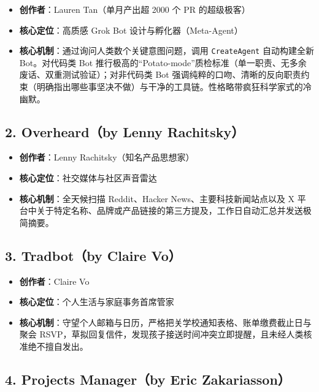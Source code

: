 \documentclass[10.5pt,a4paper,oneside]{report}
\providecommand{\tightlist}{\setlength{\itemsep}{0pt}\setlength{\parskip}{0pt}}
\newcommand{\passthrough}[1]{#1}
\begin{document}
\begin{itemize}
\tightlist
\item
  \textbf{创作者}：Lauren Tan（单月产出超 2000 个 PR 的超级极客）
\item
  \textbf{核心定位}：高质感 Grok Bot 设计与孵化器（Meta-Agent）
\item
  \textbf{核心机制}：通过询问人类数个关键意图问题，调用
  \passthrough{\lstinline!CreateAgent!} 自动构建全新 Bot。对代码类 Bot
  推行极高的``Potato-mode''质检标准（单一职责、无多余废话、双重测试验证）；对非代码类
  Bot
  强调纯粹的口吻、清晰的反向职责约束（明确指出哪些事坚决不做）与干净的工具链。性格略带疯狂科学家式的冷幽默。
\end{itemize}

\subsection{2. Overheard（by Lenny
Rachitsky）}\label{overheardby-lenny-rachitsky}

\begin{itemize}
\tightlist
\item
  \textbf{创作者}：Lenny Rachitsky（知名产品思想家）
\item
  \textbf{核心定位}：社交媒体与社区声音雷达
\item
  \textbf{核心机制}：全天候扫描 Reddit、Hacker
  News、主要科技新闻站点以及 X
  平台中关于特定名称、品牌或产品链接的第三方提及，工作日自动汇总并发送极简摘要。
\end{itemize}

\subsection{3. Tradbot（by Claire Vo）}\label{tradbotby-claire-vo}

\begin{itemize}
\tightlist
\item
  \textbf{创作者}：Claire Vo
\item
  \textbf{核心定位}：个人生活与家庭事务首席管家
\item
  \textbf{核心机制}：守望个人邮箱与日历，严格把关学校通知表格、账单缴费截止日与聚会
  RSVP，草拟回复信件，发现孩子接送时间冲突立即提醒，且未经人类核准绝不擅自发出。
\end{itemize}

\subsection{4. Projects Manager（by Eric
Zakariasson）}\label{projects-managerby-eric-zakariasson}
\end{document}
